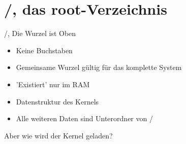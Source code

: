 \section[/]{/, das root-Verzeichnis}
\begin{frame}{/, Die Wurzel ist Oben}
\begin{itemize}
\item Keine Buchstaben
\item Gemeinsame Wurzel gültig für das komplette System
\item 'Existiert' nur im RAM
\item Datenstruktur des Kernels
\item Alle weiteren Daten sind Unterordner von /
\end{itemize}
\vspace{1cm}
Aber wie wird der Kernel geladen?
\end{frame}